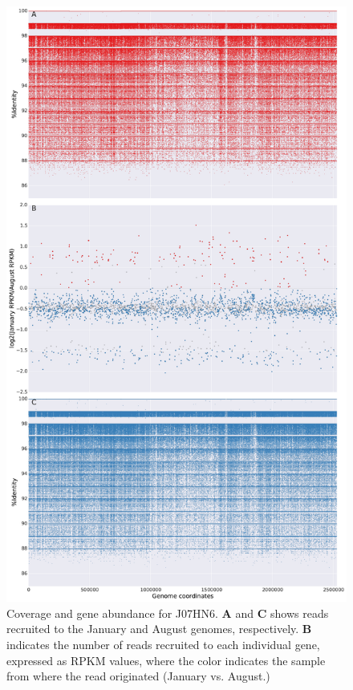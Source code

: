 \begin{figure}[!hbtp]
  \centering
  \includegraphics[width=\textwidth,height=0.8\textheight,keepaspectratio]{Chapter5/Figures/coverage_plots/J07HN6_coverage.pdf}
  \caption{Coverage and gene abundance for J07HN6. \textbf{A} and \textbf{C} shows reads recruited to the January and August genomes, respectively. \textbf{B} indicates the number of reads recruited to each individual gene, expressed as RPKM values, where the color indicates the sample from where the read originated (January vs. August.)}
  \label{J07HN6coverage}
\end{figure}

